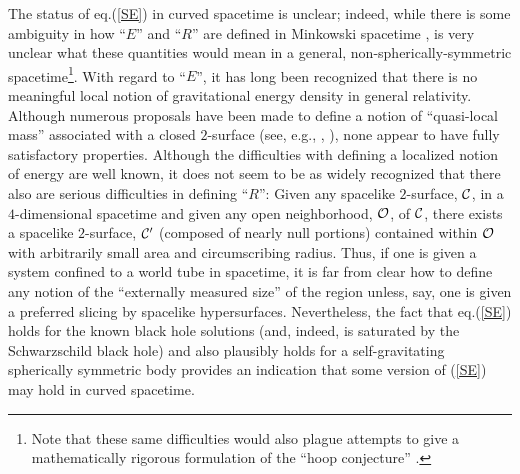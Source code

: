 The status of eq.(\ref{SE}) in curved spacetime is unclear; indeed,
while there is some ambiguity in how ``$E$'' and ``$R$'' are defined
in Minkowski spacetime \cite{page3}, is very unclear what these
quantities would mean in a general, non-spherically-symmetric
spacetime\footnote{Note that these same difficulties would also plague
attempts to give a mathematically rigorous formulation of the ``hoop
conjecture'' \cite{mtw}.}. With regard to ``$E$'', it has long been
recognized that there is no meaningful local notion of gravitational
energy density in general relativity. Although numerous proposals have
been made to define a notion of ``quasi-local mass'' associated with a
closed $2$-surface (see, e.g., \cite{p1}, \cite{by}), none appear to
have fully satisfactory properties. Although the difficulties with
defining a localized notion of energy are well known, it does not seem
to be as widely recognized that there also are serious difficulties in
defining ``$R$'': Given any spacelike $2$-surface, $\cal C$, in a
$4$-dimensional spacetime and given any open neighborhood, $\cal O$,
of $\cal C$, there exists a spacelike $2$-surface, ${\cal C}'$
(composed of nearly null portions) contained within $\cal O$ with
arbitrarily small area and circumscribing radius. Thus, if one is
given a system confined to a world tube in spacetime, it is far from
clear how to define any notion of the ``externally measured size'' of
the region unless, say, one is given a preferred slicing by spacelike
hypersurfaces. Nevertheless, the fact that eq.(\ref{SE}) holds for the
known black hole solutions (and, indeed, is saturated by the
Schwarzschild black hole) and also plausibly holds for a
self-gravitating spherically symmetric body \cite{swz} provides an
indication that some version of (\ref{SE}) may hold in curved
spacetime.

